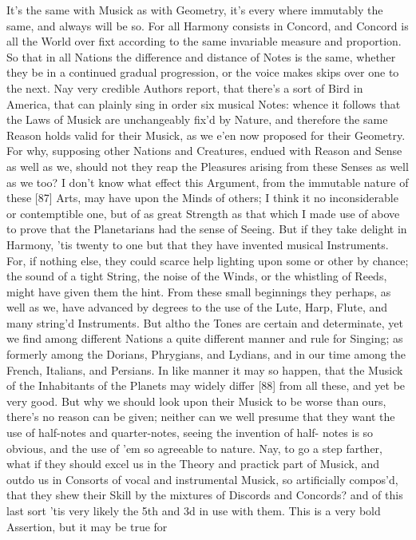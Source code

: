 \documentclass[letterpaper]{book}
\begin{document}
It's the same with Musick as with Geometry, it's every where immutably the
same, and always will be so. For all Harmony consists in Concord, and
Concord is all the World over fixt according to the same invariable measure
and proportion. So that in all Nations the difference and distance of Notes
is the same, whether they be in a continued gradual progression, or the
voice makes skips over one to the next. Nay very credible Authors report,
that there's a sort of Bird in America, that can plainly sing in order six
musical Notes: whence it follows that the Laws of Musick are unchangeably
fix'd by Nature, and therefore the same Reason holds valid for their Musick,
as we e'en now proposed for their Geometry. For why, supposing other Nations
and Creatures, endued with Reason and Sense as well as we, should not they
reap the Pleasures arising from these Senses as well as we too? I don't know
what effect this Argument, from the immutable nature of these [87] Arts, may
have upon the Minds of others; I think it no inconsiderable or contemptible
one, but of as great Strength as that which I made use of above to prove
that the Planetarians had the sense of Seeing.  But if they take delight in
Harmony, 'tis twenty to one but that they have invented musical Instruments.
For, if nothing else, they could scarce help lighting upon some or other by
chance; the sound of a tight String, the noise of the Winds, or the
whistling of Reeds, might have given them the hint.  From these small
beginnings they perhaps, as well as we, have advanced by degrees to the use
of the Lute, Harp, Flute, and many string'd Instruments.  But altho the
Tones are certain and determinate, yet we find among different Nations a
quite different manner and rule for Singing; as formerly among the Dorians,
Phrygians, and Lydians, and in our time among the French, Italians, and
Persians. In like manner it may so happen, that the Musick of the
Inhabitants of the Planets may widely differ [88] from all these, and yet be
very good. But why we should look upon their Musick to be worse than ours,
there's no reason can be given; neither can we well presume that they want
the use of half-notes and quarter-notes, seeing the invention of half- notes
is so obvious, and the use of 'em so agreeable to nature. Nay, to go a step
farther, what if they should excel us in the Theory and practick part of
Musick, and outdo us in Consorts of vocal and instrumental Musick, so
artificially compos'd, that they shew their Skill by the mixtures of
Discords and Concords? and of this last sort 'tis very likely the 5th and 3d
in use with them.  This is a very bold Assertion, but it may be true for
\end{document}
